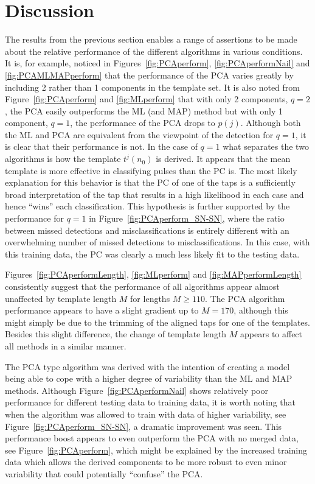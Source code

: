 \section{Discussion}

The results from the previous section enables a range of assertions to be made about the relative performance of the different algorithms in various conditions. It is, for example, noticed in Figures~\ref{fig:PCAperform}, \ref{fig:PCAperformNail} and \ref{fig:PCAMLMAPperform} that the performance of the PCA varies greatly by including 2 rather than 1 components in the template set. It is also noted from Figure~\ref{fig:PCAperform} and \ref{fig:MLperform} that with only 2 components, $q=2$, the PCA easily outperforms the ML (and MAP) method but with only 1 component, $q=1$, the performance of the PCA drops to $p(j)$. Although both the ML and PCA are equivalent from the viewpoint of the detection for $q=1$, it is clear that their performance is not. In the case of $q=1$ what separates the two algorithms is how the template $t^j(n_0)$ is derived. It appears that the mean template is more effective in classifying pulses than the PC is. The most likely explanation for this behavior is that the PC of one of the taps is a sufficiently broad interpretation of the tap that results in a high likelihood in each case and hence ``wins'' each classification. This hypothesis is further supported by the performance for $q=1$ in Figure~\ref{fig:PCAperform_SN-SN}, where the ratio between missed detections and misclassifications is entirely different with an overwhelming number of missed detections to misclassifications. In this case, with this training data, the PC was clearly a much less likely fit to the testing data.

Figures~\ref{fig:PCAperformLength}, \ref{fig:MLperform} and \ref{fig:MAPperformLength} consistently suggest that the performance of all algorithms appear almost unaffected by template length $M$ for lengths $M\geq110$. The PCA algorithm performance appears to have a slight gradient up to $M=170$, although this might simply be due to the trimming of the aligned taps for one of the templates. Besides this slight difference, the change of template length $M$ appears to affect all methods in a similar manner.

The PCA type algorithm was derived with the intention of creating a model being able to cope with a higher degree of variability than the ML and MAP methods. Although Figure~\ref{fig:PCAperformNail} shows relatively poor performance for different testing data to training data, it is worth noting that when the algorithm was allowed to train with data of higher variability, see Figure~\ref{fig:PCAperform_SN-SN}, a dramatic improvement was seen. This performance boost appears to even outperform the PCA with no merged data, see Figure~\ref{fig:PCAperform}, which might be explained by the increased training data which allows the derived components to be more robust to even minor variability that could potentially ``confuse'' the PCA.

